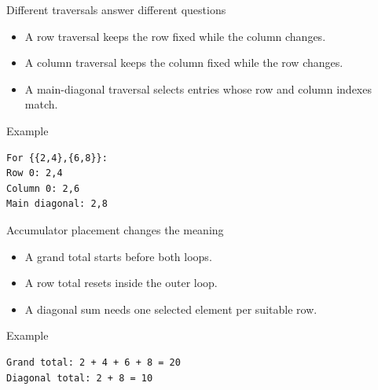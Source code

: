 \documentclass[10pt,aspectratio=169]{beamer}
\begin{document}
\begin{frame}[fragile,t]{Different traversals answer different questions}
\begin{itemize}
\item A row traversal keeps the row fixed while the column changes.
\item A column traversal keeps the column fixed while the row changes.
\item A main-diagonal traversal selects entries whose row and column indexes match.
\end{itemize}
\vspace{1mm}\begin{block}{Example}
\begin{lstlisting}
For {{2,4},{6,8}}:
Row 0: 2,4
Column 0: 2,6
Main diagonal: 2,8
\end{lstlisting}
\end{block}
\end{frame}

\begin{frame}[fragile,t]{Accumulator placement changes the meaning}
\begin{itemize}
\item A grand total starts before both loops.
\item A row total resets inside the outer loop.
\item A diagonal sum needs one selected element per suitable row.
\end{itemize}
\vspace{1mm}\begin{block}{Example}
\begin{lstlisting}
Grand total: 2 + 4 + 6 + 8 = 20
Diagonal total: 2 + 8 = 10
\end{lstlisting}
\end{block}
\end{frame}
\end{document}
